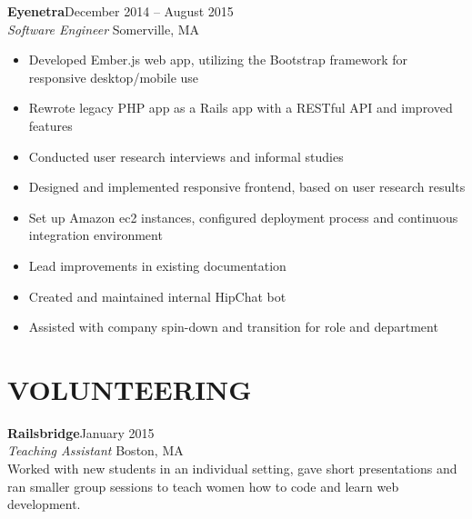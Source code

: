 \documentclass[margin]{res}
\begin{document}
\begin{resume}
 
 			 {\bf Eyenetra}\hfill December 2014 -- August 2015 \\
			{\sl Software Engineer} \hfill Somerville, MA\
			\begin{itemize} \itemsep -2pt
			\item Developed Ember.js web app, utilizing the Bootstrap framework for responsive desktop/mobile use
			\item Rewrote legacy PHP app as a Rails app with a RESTful API and improved features
			\item Conducted user research interviews and informal studies
			\item Designed and implemented responsive frontend, based on user research results
			\item Set up Amazon ec2 instances, configured deployment process and continuous integration environment
			\item Lead improvements in existing documentation 
			\item Created and maintained internal HipChat bot
			\item Assisted with company spin-down and transition for role and department		
			\end{itemize}
                 
\section{VOLUNTEERING} {\bf Railsbridge}\hfill January 2015\\
  {\sl Teaching Assistant }\hfill Boston, MA\\
  Worked with new students in an individual setting, gave short presentations and ran smaller group sessions to teach women how to code and learn web development.
  

\end{resume}
\end{document}
